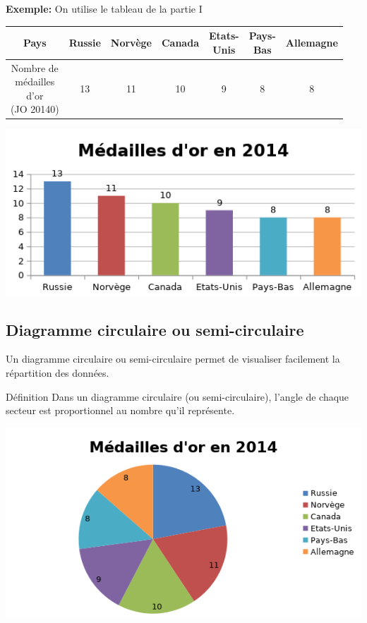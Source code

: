 \documentclass[12pt,a4paper]{article}
\begin{document}
\newpage

\textbf{Exemple:} On utilise le tableau de la partie I\\
\begin{center}
\begin{tabular}{|c|c|c|c|c|c|c|}
\hline
Pays       & Russie & Norvège & Canada & \thead{Etats-\\Unis} & \thead{Pays-\\Bas} & Allemagne
\\ \hline
\thead{Nombre de\\ médailles \\d’or\\ (JO 20140)}   & 13 & 11 & 10 & 9 & 8 & 8 \\ \hline
\end{tabular}
\includegraphics[scale=1]{img/diag-bat2.png} 
\end{center}

\subsection{Diagramme circulaire ou semi-circulaire}

Un diagramme circulaire ou semi-circulaire permet de visualiser facilement la répartition des données.\\

\begin{definition}{Définition}
Dans un diagramme circulaire (ou semi-circulaire), l’angle de chaque secteur est proportionnel au nombre qu’il représente.
\end{definition}

\includegraphics[scale=1]{img/diag-camb2.png} 
\end{document}
